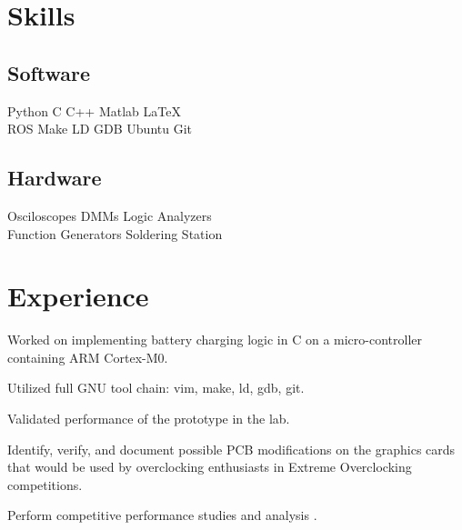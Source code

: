 \documentclass[]{deedy-resume-openfont}
\begin{document}
\section{Skills}
\begin{minipage}[t]{.6\textwidth}
\subsection{Software}
Python \textbullet{} C \textbullet{} C++ \textbullet{} Matlab \textbullet{}
\LaTeX\ \\ 
ROS \textbullet{} Make \textbullet{} LD \textbullet{} GDB \textbullet{} Ubuntu \textbullet{} Git
\sectionsep
\end{minipage}
\hfill
\begin{minipage}[t]{.35\textwidth}
\subsection{Hardware}
Osciloscopes \textbullet{} DMMs \textbullet{} Logic Analyzers\\
Function Generators \textbullet{} Soldering Station\\ 
\end{minipage}

\section{Experience}

\begin{tightemize}
\item Worked on implementing battery charging logic in C on a micro-controller containing ARM Cortex-M0.
\item Utilized full GNU tool chain: vim, make, ld, gdb, git.
\item Validated performance of the prototype in the lab.
\end{tightemize}
\sectionsep

\begin{tightemize}
\item Identify, verify, and document possible PCB modifications on the graphics cards that would be used by overclocking enthusiasts in Extreme Overclocking competitions.
\item Perform competitive performance studies and analysis .
\end{tightemize}
\sectionsep
\end{document}
